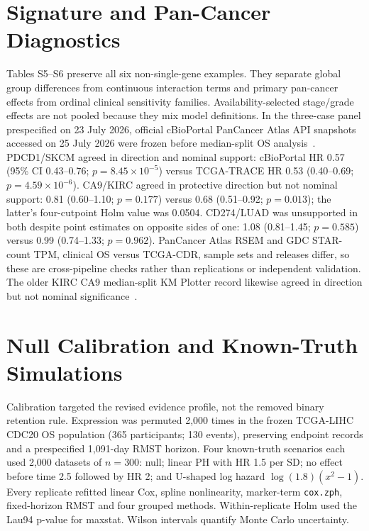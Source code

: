 \documentclass[12pt]{article}
\begin{document}
\section*{Signature and Pan-Cancer Diagnostics}

Tables S5--S6 preserve all six non-single-gene examples. They separate global
group differences from continuous interaction terms and primary pan-cancer
effects from ordinal clinical sensitivity families. Availability-selected
stage/grade effects are not pooled because they mix model definitions. In the
three-case panel prespecified on 23 July 2026, official cBioPortal PanCancer
Atlas API snapshots accessed on 25 July 2026 were frozen before median-split OS
analysis~\citep{cbioportal2012,cbioportalApi2026}. PDCD1/SKCM agreed in direction
and nominal support: cBioPortal HR 0.57 (95\% CI 0.43--0.76; \(p=8.45\times
10^{-5}\)) versus TCGA-TRACE HR 0.53 (0.40--0.69; \(p=4.59\times10^{-6}\)).
CA9/KIRC agreed in protective direction but not nominal support: 0.81
(0.60--1.10; \(p=0.177\)) versus 0.68 (0.51--0.92; \(p=0.013\)); the latter's
four-cutpoint Holm value was 0.0504. CD274/LUAD was unsupported in both despite
point estimates on opposite sides of one: 1.08 (0.81--1.45; \(p=0.585\))
versus 0.99 (0.74--1.33; \(p=0.962\)). PanCancer Atlas RSEM and GDC STAR-count
TPM, clinical OS versus TCGA-CDR, sample sets and releases differ, so these are
cross-pipeline checks rather than replications or independent validation. The
older KIRC CA9 median-split KM Plotter record likewise agreed in direction but
not nominal significance~\citep{kmplotterWeb2026}.




\begingroup
{}
\section*{Null Calibration and Known-Truth Simulations}

Calibration targeted the revised evidence profile, not the removed binary
retention rule. Expression was permuted 2,000 times in the frozen TCGA-LIHC
CDC20 OS population (365 participants; 130 events), preserving endpoint
records and a prespecified 1,091-day RMST horizon. Four known-truth scenarios
each used 2,000 datasets of \(n=300\): null; linear PH with HR 1.5 per SD;
no effect before time 2.5 followed by HR 2; and U-shaped log hazard
\(\log(1.8)(x^2-1)\). Every replicate refitted linear Cox, spline
nonlinearity, marker-term \texttt{cox.zph}, fixed-horizon RMST and four grouped
methods. Within-replicate Holm used the Lau94 p-value for maxstat. Wilson intervals
quantify Monte Carlo uncertainty.
\end{document}
